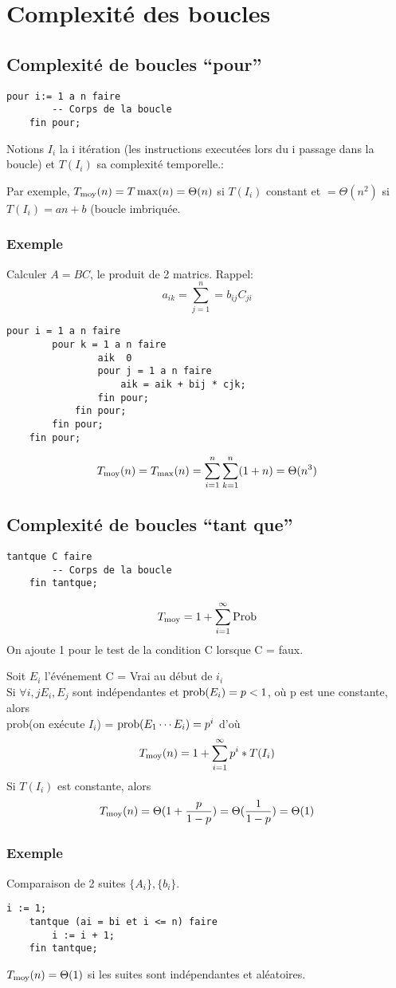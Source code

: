 \chapter{Complexité des boucles}
	\section{Complexité de boucles ``pour''}
\begin{lstlisting}[language=algo]
	pour i:= 1 a n faire
		-- Corps de la boucle
	fin pour;
\end{lstlisting}
Notions $I_i$ la i\ieme{} itération (les instructions executées lors du i\ieme{} passage dans la boucle) et $T(I_i)$ sa complexité temporelle.:

Par exemple, $T_\moy(n) = T\max(n) = \Theta(n)$ si $T(I_i)$ constant et $= \Theta(n^2)$ si $T(I_i) = an+b$ (boucle imbriquée.

\subsection{Exemple}
Calculer $A=BC$, le produit de 2 matrics. Rappel:
$$a_{ik} = \sum^n_{j=1} = b_{ij}C_{ji}$$
\begin{lstlisting}[language=algo]
	pour i = 1 a n faire
		pour k = 1 a n faire
				aik  0
				pour j = 1 a n faire
					aik = aik + bij * cjk;
				fin pour;
			fin pour;
		fin pour;
	fin pour;
\end{lstlisting}

$$T_{\moy}(n) = T_{\max}(n) = \sum^n_{i=1}\sum^n_{k=1}(1+n) = \Theta(n^3)$$

\newpage
\section{Complexité de boucles ``tant que''}

\begin{lstlisting}[language=algo]
	tantque C faire
		-- Corps de la boucle
	fin tantque;
\end{lstlisting}
$$T_{\moy} = 1 + \sum^\infty_{i=1}\textrm{Prob}$$
On ajoute 1 pour le test de la condition C lorsque C = faux.

Soit $E_i$ l'événement C = Vrai au début de $i_i$\\
Si $\forall i, j E_i, E_j$ sont indépendantes et $\prob(E_i) = p < 1$, où p est une constante, alors\\ prob(on exécute $I_i$) = $\prob(E_1\cdots E_i) = p^i$ d'où
$$T_{\moy}(n) = 1 + \sum^{\infty}_{i=1}p^i*T(I_i)$$
Si $T(I_i)$ est constante, alors $$T_{\moy}(n) = \Theta (1 + \frac{p}{1-p}) = \Theta (\frac{1}{1-p}) = \Theta(1)$$

\subsection{Exemple}
Comparaison de 2 suites $\{A_i\},\{b_i\}$.
\begin{lstlisting}[language=algo]
	i := 1;
	tantque (ai = bi et i <= n) faire
		i := i + 1;
	fin tantque;
\end{lstlisting}
$T_{\moy}(n) = \Theta(1)$ si les suites sont indépendantes et aléatoires.

